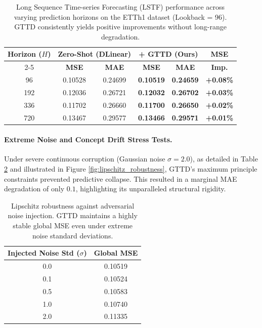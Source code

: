 \documentclass{article}
\begin{document}
\begin{table}[htbp]
    \centering
    \caption{Long Sequence Time-series Forecasting (LSTF) performance across varying prediction horizons on the ETTh1 dataset (Lookback = 96). GTTD consistently yields positive improvements without long-range degradation.}
    \label{tab:horizon_stability}
    \renewcommand{\arraystretch}{1.2}
    \begin{tabular}{c | cc | cc | c}
    \toprule
    \multirow{2}{*}{\textbf{Horizon ($H$)}} & \multicolumn{2}{c|}{\textbf{Zero-Shot (DLinear)}} & \multicolumn{2}{c|}{\textbf{+ GTTD (Ours)}} & \textbf{MSE} \\
    \cmidrule{2-5}
    & \textbf{MSE} & \textbf{MAE} & \textbf{MSE} & \textbf{MAE} & \textbf{Imp.} \\ 
    \midrule
    96  & 0.10528 & 0.24699 & \textbf{0.10519} & \textbf{0.24659} & \textbf{+0.08\%} \\
    192 & 0.12036 & 0.26721 & \textbf{0.12032} & \textbf{0.26702} & \textbf{+0.03\%} \\
    336 & 0.11702 & 0.26660 & \textbf{0.11700} & \textbf{0.26650} & \textbf{+0.02\%} \\
    720 & 0.13467 & 0.29577 & \textbf{0.13466} & \textbf{0.29571} & \textbf{+0.01\%} \\
    \bottomrule
    \end{tabular}
\end{table}

\paragraph{Extreme Noise and Concept Drift Stress Tests.} Under severe continuous corruption (Gaussian noise $\sigma=2.0$), as detailed in Table \ref{tab:noise_robustness} and illustrated in Figure \ref{fig:lipschitz_robustness}, GTTD's maximum principle constraints prevented predictive collapse. This resulted in a marginal MAE degradation of only $0.1$, highlighting its unparalleled structural rigidity.

\begin{table}[ht]
    \centering
    \caption{Lipschitz robustness against adversarial noise injection. GTTD maintains a highly stable global MSE even under extreme noise standard deviations.}
    \label{tab:noise_robustness}
    \renewcommand{\arraystretch}{1.2}
    \begin{tabular}{cc}
    \toprule
    \textbf{Injected Noise Std ($\sigma$)} & \textbf{Global MSE} \\
    \midrule
    0.0 & 0.10519 \\
    0.1 & 0.10524 \\
    0.5 & 0.10583 \\
    1.0 & 0.10740 \\
    2.0 & 0.11335 \\
    \bottomrule
    \end{tabular}
\end{table}
    
\end{document}
